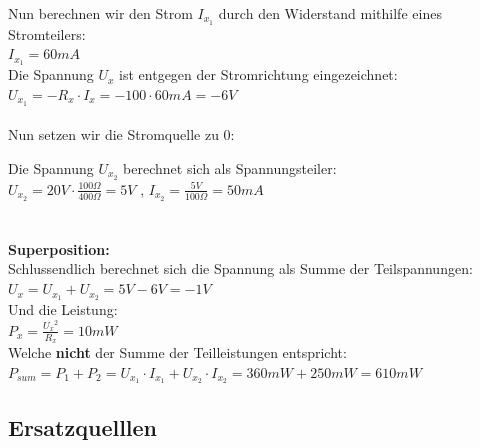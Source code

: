 Nun berechnen wir den Strom $I_{x_1}$ durch den Widerstand mithilfe eines Stromteilers: \\
$I_{x_1} = 60mA$ \\
Die Spannung $U_x$ ist entgegen der Stromrichtung eingezeichnet: \\
$U_{x_1} = - R_x \cdot I_x = - 100 \cdot 60mA = -6V $ \\
\\
Nun setzen wir die Stromquelle zu 0: \\
\begin{center}
	\fix
\end{center}

Die Spannung $U_{x_2}$ berechnet sich als Spannungsteiler: \\
$U_{x_2} = 20V \cdot \frac{100\Omega}{400\Omega} = 5V$ , $ I_{x_2} = \frac{5V}{100\Omega} = 50mA $\\
\\
\\
\textbf{Superposition:} \\
Schlussendlich berechnet sich die Spannung als Summe der Teilspannungen: \\
$\displaystyle U_x = U_{x_1} + U_{x_2} = 5V -6V = -1V $ \\
Und die Leistung: \\
$\displaystyle P_x = \frac{{U_x}^2}{R_x} = 10mW$ \\
Welche \textbf{nicht} der Summe der Teilleistungen entspricht: \\
$\displaystyle P_{sum} = P_1 + P_2 = U_{x_1} \cdot I_{x_1} + U_{x_2} \cdot I_{x_2} = 360mW + 250mW = 610mW$


\iend

\newpage

\subsection{Ersatzquelllen}



